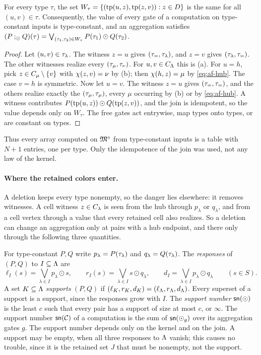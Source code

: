 \begin{lemma}[Homogeneity]\label{lem:af-profile}
For every type $\tau$, the set
$W_\tau=\{(\operatorname{tp}(u,z),\operatorname{tp}(z,v)):z\in D\}$ is the same for all
$(u,v)\in\tau$. Consequently, the value of every gate of a computation on
type-constant inputs is type-constant, and an aggregation satisfies
$(P\mathbin{;_{\odot}} Q)(\tau)=\bigvee_{(\tau_1,\tau_2)\in W_\tau}P(\tau_1)\odot
Q(\tau_2)$.
\end{lemma}
\begin{proof}
Let $(u,v)\in\tau_{\lambda}$. The witness $z=u$ gives
$(\tau_{=},\tau_{\lambda})$, and $z=v$ gives $(\tau_{\lambda},\tau_{=})$. The other
witnesses realize every $(\tau_{\mu},\tau_{\nu})$. For $u,v\in C_{\Lambda}$ this
is (a). For $u=h$, pick $z\in C_{\mu}\setminus\{v\}$ with
$\chi(z,v)=\nu$ by (b); then $\chi(h,z)=\mu$ by \eqref{eq:af-hub}. The
case $v=h$ is symmetric. Now let $u=v$. The witness $z=u$ gives
$(\tau_{=},\tau_{=})$, and the others realize exactly the $(\tau_{\mu},\tau_{\mu})$,
every $\mu$ occurring by (b) or by \eqref{eq:af-hub}. A witness contributes
$P(\operatorname{tp}(u,z))\odot Q(\operatorname{tp}(z,v))$, and the join is idempotent, so the value
depends only on $W_\tau$. The free gates act entrywise, map types onto
types, or are constant on types.
\end{proof}
Thus every array computed on $\mathfrak M^\circ$ from type-constant inputs is a
table with $N+1$ entries, one per type. Only the idempotence of the join
was used, not any law of the kernel.

\paragraph{Where the retained colors enter.}
A deletion keeps every type nonempty, so the danger lies elsewhere: it
removes witnesses. A cell witness $z\in C_{\lambda}$ is seen from the hub
through $p_\lambda$ or $q_\lambda$, and from a cell vertex through a value
that every retained cell also realizes. So a deletion can change an
aggregation only at pairs with a hub endpoint, and there only through the
following three quantities.

For type-constant $P,Q$ write $p_\lambda=P(\tau_{\lambda})$ and
$q_\lambda=Q(\tau_{\lambda})$. The \emph{responses} of $(P,Q)$ to
$I\subseteq\Lambda$ are
\[
 \ell_I(s)=\bigvee_{\lambda\in I}p_\lambda\odot s,\qquad
 r_I(s)=\bigvee_{\lambda\in I}s\odot q_\lambda,\qquad
 d_I=\bigvee_{\lambda\in I}p_\lambda\odot q_\lambda\qquad(s\in S).
\]
A set $K\subseteq\Lambda$ \emph{supports} $(P,Q)$ if
$(\ell_K,r_K,d_K)=(\ell_\Lambda,r_\Lambda,d_\Lambda)$. Every superset of a support
is a support, since the responses grow with $I$. The \emph{support
number} $\mathsf{sn}(\odot)$ is the least $c$ such that every pair has a support of
size at most $c$, or $\infty$. The support number $\mathsf{sn}(\mathcal C)$ of a
computation is the sum of $\mathsf{sn}(\odot_g)$ over its aggregation gates $g$.
The support number depends only on the kernel and on the join. A support
may be empty, when all three responses to $\Lambda$ vanish; this causes no
trouble, since it is the retained set $J$ that must be nonempty, not the
support.

